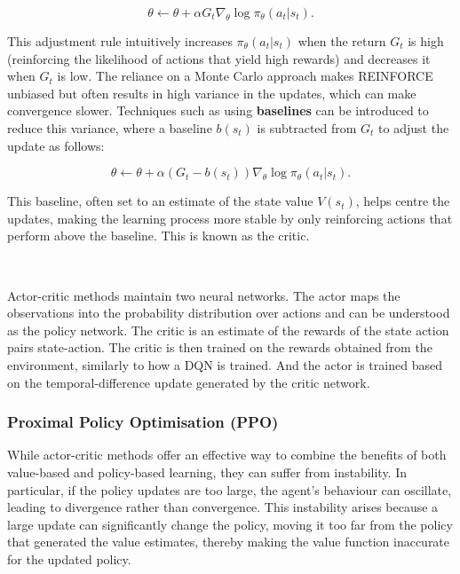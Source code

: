 \documentclass{article}
\begin{document}
\begin{equation}
\theta \leftarrow \theta + \alpha G_t \nabla_\theta \log \pi_\theta(a_t | s_t).
\end{equation}

This adjustment rule intuitively increases $\pi_\theta(a_t | s_t)$ when the return $G_t$ is high (reinforcing the likelihood of actions that yield high rewards) and decreases it when $G_t$ is low. The reliance on a Monte Carlo approach makes REINFORCE unbiased but often results in high variance in the updates, which can make convergence slower. Techniques such as using \textbf{baselines} can be introduced to reduce this variance, where a baseline $b(s_t)$ is subtracted from $G_t$ to adjust the update as follows:

\begin{equation}
\theta \leftarrow \theta + \alpha (G_t - b(s_t)) \nabla_\theta \log \pi_\theta(a_t | s_t).
\end{equation}

This baseline, often set to an estimate of the state value $V(s_t)$, helps centre the updates, making the learning process more stable by only reinforcing actions that perform above the baseline. This is known as the critic.

\

Actor-critic methods maintain two neural networks. The actor maps the observations into the probability distribution over actions and can be understood as the policy network. The critic is an estimate of the rewards of the state action pairs state-action. The critic is then trained on the rewards obtained from the environment, similarly to how a DQN is trained. And the actor is trained based on the temporal-difference update generated by the critic network. 

\subsubsection{Proximal Policy Optimisation (PPO)}

While actor-critic methods offer an effective way to combine the benefits of both value-based and policy-based learning, they can suffer from instability. In particular, if the policy updates are too large, the agent's behaviour can oscillate, leading to divergence rather than convergence. This instability arises because a large update can significantly change the policy, moving it too far from the policy that generated the value estimates, thereby making the value function inaccurate for the updated policy.
\end{document}
